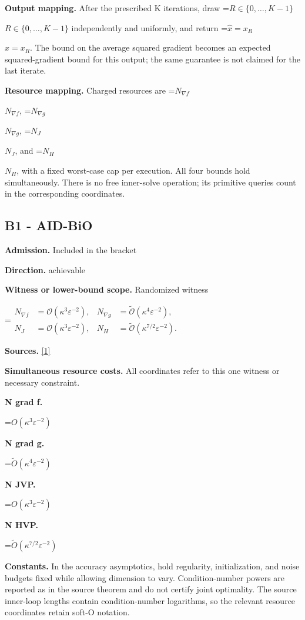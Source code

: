 \documentclass[10pt,a4paper]{article}
\newcommand{\AtlasMath}[1]{\par\begingroup\centering\setbox0=\hbox{$\displaystyle #1$}\ifdim\wd0>1.4\linewidth\typeout{ATLAS WIDE FORMULA: \the\wd0}\fi\ifdim\wd0>\linewidth\resizebox{\linewidth}{!}{\box0}\else\box0\fi\par\endgroup}
\newcommand{\AtlasInlineMath}[1]{\begingroup\setbox0=\hbox{$#1$}\ifdim\wd0>.4\linewidth\endgroup\AtlasMath{#1}\else\endgroup$#1$\fi}
\begin{document}
\textbf{Output mapping.} After the prescribed K iterations, draw \AtlasInlineMath{R\in\{0,\ldots,K-1\}} independently and uniformly, and return \AtlasInlineMath{\widehat x=x_R}. The bound on the average squared gradient becomes an expected squared-gradient bound for this output; the same guarantee is not claimed for the last iterate.

\textbf{Resource mapping.} Charged resources are \AtlasInlineMath{N_{\nabla f}}, \AtlasInlineMath{N_{\nabla g}}, \AtlasInlineMath{N_J}, and \AtlasInlineMath{N_H}, with a fixed worst-case cap per execution. All four bounds hold simultaneously. There is no free inner-solve operation; its primitive queries count in the corresponding coordinates.

\subsection{B1 - AID-BiO}
\textbf{Admission.} Included in the bracket

\textbf{Direction.} achievable

\textbf{Witness or lower-bound scope.} Randomized witness

\AtlasMath{\begin{aligned}N_{\nabla f}&=\mathcal O(\kappa^3\varepsilon^{-2}),&N_{\nabla g}&=\widetilde{\mathcal O}(\kappa^4\varepsilon^{-2}),\\N_J&=\mathcal O(\kappa^3\varepsilon^{-2}),&N_H&=\widetilde{\mathcal O}(\kappa^{7/2}\varepsilon^{-2}).\end{aligned}}
\textbf{Sources.} \href{https://proceedings.mlr.press/v139/ji21c/ji21c.pdf}{[1]}

\textbf{Simultaneous resource costs.} All coordinates refer to this one witness or necessary constraint.

\textbf{N grad f.}

\AtlasMath{O(\kappa ^3\varepsilon ^{-2})}
\textbf{N grad g.}

\AtlasMath{\widetilde O(\kappa^4\varepsilon^{-2})}
\textbf{N JVP.}

\AtlasMath{O(\kappa ^3\varepsilon ^{-2})}
\textbf{N HVP.}

\AtlasMath{\widetilde O(\kappa^{7/2}\varepsilon^{-2})}
\textbf{Constants.} In the accuracy asymptotics, hold regularity, initialization, and noise budgets fixed while allowing dimension to vary. Condition-number powers are reported as in the source theorem and do not certify joint optimality. The source inner-loop lengths contain condition-number logarithms, so the relevant resource coordinates retain soft-O notation.
\end{document}
